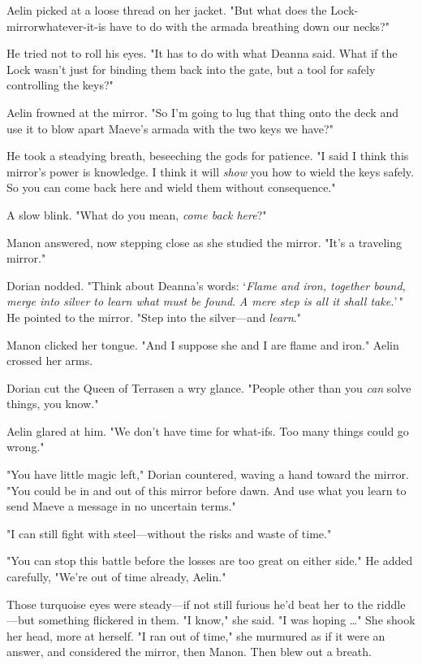 Aelin picked at a loose thread on her jacket. "But what does the Lock-mirrorwhatever-it-is have to do with the armada breathing down our necks?"

He tried not to roll his eyes. "It has to do with what Deanna said. What if the Lock wasn't just for binding them back into the gate, but a tool for safely controlling the keys?"

Aelin frowned at the mirror. "So I'm going to lug that thing onto the deck and use it to blow apart Maeve's armada with the two keys we have?"

He took a steadying breath, beseeching the gods for patience. "I said I think this mirror's power is knowledge. I think it will \emph{show} you how to wield the keys safely. So you can come back here and wield them without consequence."

A slow blink. "What do you mean, \emph{come back here}?"

Manon answered, now stepping close as she studied the mirror. "It's a traveling mirror."

Dorian nodded. "Think about Deanna's words: `\emph{Flame and iron, together bound, merge into silver to learn what must be found}. \emph{A mere step is all it shall take.}'\," He pointed to the mirror. "Step into the silver---and \emph{learn}."

Manon clicked her tongue. "And I suppose she and I are flame and iron." Aelin crossed her arms.

Dorian cut the Queen of Terrasen a wry glance. "People other than you
\emph{can} solve things, you know."

Aelin glared at him. "We don't have time for what-ifs. Too many things could go wrong."

"You have little magic left," Dorian countered, waving a hand toward the mirror. "You could be in and out of this mirror before dawn. And use what you learn to send Maeve a message in no uncertain terms."

"I can still fight with steel---without the risks and waste of time."

"You can stop this battle before the losses are too great on either side." He added carefully, "We're out of time already, Aelin."

Those turquoise eyes were steady---if not still furious he'd beat her to the riddle---but something flickered in them. "I know," she said. "I was hoping \ldots" She shook her head, more at herself. "I ran out of time," she murmured as if it were an answer, and considered the mirror, then Manon. Then blew out a breath.

